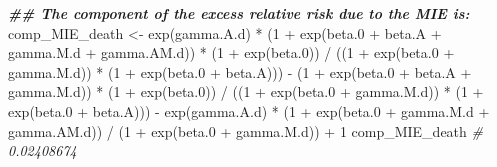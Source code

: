 \documentclass[
]{book}
\newenvironment{Shaded}{\begin{snugshade}}{\end{snugshade}}
\newcommand{\CommentTok}[1]{\textcolor[rgb]{0.56,0.35,0.01}{\textit{#1}}}
\newcommand{\DecValTok}[1]{\textcolor[rgb]{0.00,0.00,0.81}{#1}}
\newcommand{\DocumentationTok}[1]{\textcolor[rgb]{0.56,0.35,0.01}{\textbf{\textit{#1}}}}
\newcommand{\FloatTok}[1]{\textcolor[rgb]{0.00,0.00,0.81}{#1}}
\newcommand{\FunctionTok}[1]{\textcolor[rgb]{0.00,0.00,0.00}{#1}}
\newcommand{\NormalTok}[1]{#1}
\newcommand{\OtherTok}[1]{\textcolor[rgb]{0.56,0.35,0.01}{#1}}
\newcommand{\SpecialCharTok}[1]{\textcolor[rgb]{0.00,0.00,0.00}{#1}}
\begin{document}
\begin{Shaded}
\begin{Highlighting}[]
\DocumentationTok{\#\# The component of the excess relative risk due to the MIE is:}
\NormalTok{comp\_MIE\_death }\OtherTok{\textless{}{-}} \FunctionTok{exp}\NormalTok{(gamma.A.d) }\SpecialCharTok{*}\NormalTok{ (}\DecValTok{1} \SpecialCharTok{+} \FunctionTok{exp}\NormalTok{(beta}\FloatTok{.0} \SpecialCharTok{+}\NormalTok{ beta.A }\SpecialCharTok{+}\NormalTok{ gamma.M.d }\SpecialCharTok{+}
\NormalTok{                                              gamma.AM.d)) }\SpecialCharTok{*}\NormalTok{ (}\DecValTok{1} \SpecialCharTok{+} \FunctionTok{exp}\NormalTok{(beta}\FloatTok{.0}\NormalTok{)) }\SpecialCharTok{/}
\NormalTok{  ((}\DecValTok{1} \SpecialCharTok{+} \FunctionTok{exp}\NormalTok{(beta}\FloatTok{.0} \SpecialCharTok{+}\NormalTok{ gamma.M.d)) }\SpecialCharTok{*}\NormalTok{ (}\DecValTok{1} \SpecialCharTok{+} \FunctionTok{exp}\NormalTok{(beta}\FloatTok{.0} \SpecialCharTok{+}\NormalTok{ beta.A))) }\SpecialCharTok{{-}}
\NormalTok{  (}\DecValTok{1} \SpecialCharTok{+} \FunctionTok{exp}\NormalTok{(beta}\FloatTok{.0} \SpecialCharTok{+}\NormalTok{ beta.A }\SpecialCharTok{+}\NormalTok{ gamma.M.d)) }\SpecialCharTok{*}\NormalTok{ (}\DecValTok{1} \SpecialCharTok{+} \FunctionTok{exp}\NormalTok{(beta}\FloatTok{.0}\NormalTok{)) }\SpecialCharTok{/}
\NormalTok{  ((}\DecValTok{1} \SpecialCharTok{+} \FunctionTok{exp}\NormalTok{(beta}\FloatTok{.0} \SpecialCharTok{+}\NormalTok{ gamma.M.d)) }\SpecialCharTok{*}\NormalTok{ (}\DecValTok{1} \SpecialCharTok{+} \FunctionTok{exp}\NormalTok{(beta}\FloatTok{.0} \SpecialCharTok{+}\NormalTok{ beta.A))) }\SpecialCharTok{{-}}
  \FunctionTok{exp}\NormalTok{(gamma.A.d) }\SpecialCharTok{*}\NormalTok{ (}\DecValTok{1} \SpecialCharTok{+} \FunctionTok{exp}\NormalTok{(beta}\FloatTok{.0} \SpecialCharTok{+}\NormalTok{ gamma.M.d }\SpecialCharTok{+}\NormalTok{ gamma.AM.d)) }\SpecialCharTok{/}
\NormalTok{  (}\DecValTok{1} \SpecialCharTok{+} \FunctionTok{exp}\NormalTok{(beta}\FloatTok{.0} \SpecialCharTok{+}\NormalTok{ gamma.M.d)) }\SpecialCharTok{+} \DecValTok{1}
\NormalTok{comp\_MIE\_death}
\CommentTok{\# 0.02408674}


\end{Highlighting}
\end{Shaded}
\end{document}
